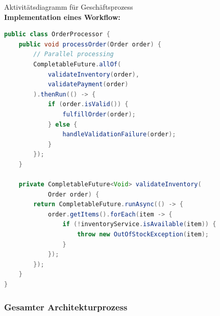 \begin{example2}{Aktivitätsdiagramm für Geschäftsprozess}\\
\textbf{Implementation eines Workflow:}

\begin{lstlisting}[language=Java, style=basesmol]
public class OrderProcessor {
    public void processOrder(Order order) {
        // Parallel processing
        CompletableFuture.allOf(
            validateInventory(order),
            validatePayment(order)
        ).thenRun(() -> {
            if (order.isValid()) {
                fulfillOrder(order);
            } else {
                handleValidationFailure(order);
            }
        });
    }
    
    private CompletableFuture<Void> validateInventory(
            Order order) {
        return CompletableFuture.runAsync(() -> {
            order.getItems().forEach(item -> {
                if (!inventoryService.isAvailable(item)) {
                    throw new OutOfStockException(item);
                }
            });
        });
    }
}
\end{lstlisting}
\end{example2}

\pagebreak

\subsubsection{Gesamter Architekturprozess}

